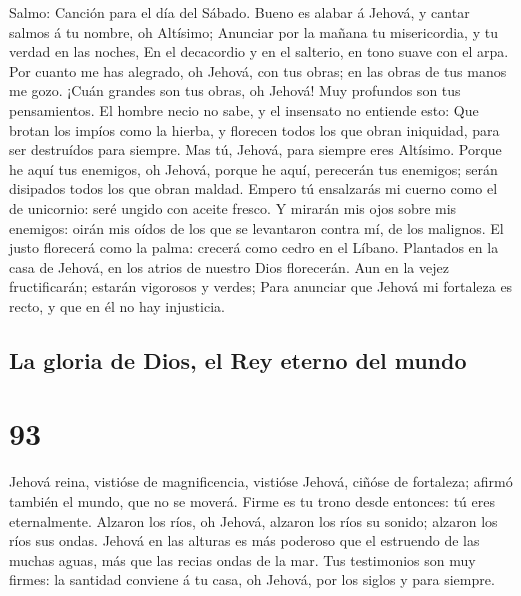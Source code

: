  Salmo: Canción para el día del Sábado. Bueno es alabar á
Jehová, y cantar salmos á tu nombre, oh Altísimo; 
Anunciar por la mañana tu misericordia, y tu verdad en las noches,
 En el decacordio y en el salterio, en tono suave con el
arpa.  Por cuanto me has alegrado, oh Jehová, con tus
obras; en las obras de tus manos me gozo.  ¡Cuán grandes
son tus obras, oh Jehová! Muy profundos son tus pensamientos.
 El hombre necio no sabe, y el insensato no entiende esto:
 Que brotan los impíos como la hierba, y florecen todos
los que obran iniquidad, para ser destruídos para siempre.
 Mas tú, Jehová, para siempre eres Altísimo.
 Porque he aquí tus enemigos, oh Jehová, porque he aquí,
perecerán tus enemigos; serán disipados todos los que obran maldad.
 Empero tú ensalzarás mi cuerno como el de unicornio:
seré ungido con aceite fresco.  Y mirarán mis ojos sobre
mis enemigos: oirán mis oídos de los que se levantaron contra mí, de los
malignos.  El justo florecerá como la palma: crecerá como
cedro en el Líbano.  Plantados en la casa de Jehová, en
los atrios de nuestro Dios florecerán.  Aun en la vejez
fructificarán; estarán vigorosos y verdes;  Para anunciar
que Jehová mi fortaleza es recto, y que en él no hay injusticia.

\hypertarget{la-gloria-de-dios-el-rey-eterno-del-mundo}{%
\subsection{La gloria de Dios, el Rey eterno del
mundo}\label{la-gloria-de-dios-el-rey-eterno-del-mundo}}

\hypertarget{section-92}{%
\section{93}\label{section-92}}

 Jehová reina, vistióse de magnificencia, vistióse Jehová,
ciñóse de fortaleza; afirmó también el mundo, que no se moverá.
 Firme es tu trono desde entonces: tú eres eternalmente.
 Alzaron los ríos, oh Jehová, alzaron los ríos su sonido;
alzaron los ríos sus ondas.  Jehová en las alturas es más
poderoso que el estruendo de las muchas aguas, más que las recias ondas
de la mar.  Tus testimonios son muy firmes: la santidad
conviene á tu casa, oh Jehová, por los siglos y para siempre.

